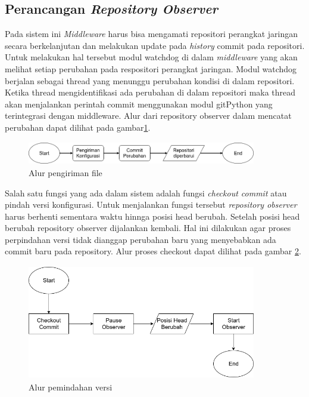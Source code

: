         \subsection{Perancangan \textit{Repository Observer}}
            Pada sistem ini \textit{Middleware} harus bisa mengamati repositori perangkat jaringan secara berkelanjutan dan melakukan update pada \textit{history} commit pada repositori. Untuk melakukan hal tersebut modul watchdog di dalam \textit{middleware} yang akan melihat setiap perubahan pada respositori perangkat jaringan. Modul watchdog berjalan sebagai thread yang menunggu perubahan kondisi di dalam repositori. Ketika thread mengidentifikasi ada perubahan di dalam repositori maka thread akan menjalankan perintah commit menggunakan modul gitPython yang terintegrasi dengan middleware. Alur dari repository observer dalam mencatat perubahan dapat dilihat pada gambar\ref{desain_pengirimanfile}.
            \begin{figure}[H]
            	\centering
            	\includegraphics[width=10cm,height=1cm]{Images/C-3/AlurPengirimanFile.png}
            	\caption{Alur pengiriman file}
            	\label{desain_pengirimanfile}
            \end{figure}
        	\indent Salah satu fungsi yang ada dalam sistem adalah fungsi \textit{checkout commit} atau pindah versi konfigurasi. Untuk menjalankan fungsi tersebut \textit{repository observer} harus berhenti sementara waktu hinnga posisi head berubah. Setelah posisi head berubah repository observer dijalankan kembali. Hal ini dilakukan agar proses perpindahan versi tidak dianggap perubahan baru yang menyebabkan ada commit baru pada repository. Alur proses checkout dapat dilihat pada gambar \ref{CheckoutBranch}.
        	 \begin{figure}[H]
        		\centering
        		\includegraphics[width=10cm,height=5cm]{Images/C-3/Flow-Checkout.png}
        		\caption{Alur pemindahan versi}
        		\label{CheckoutBranch}
        	\end{figure}
